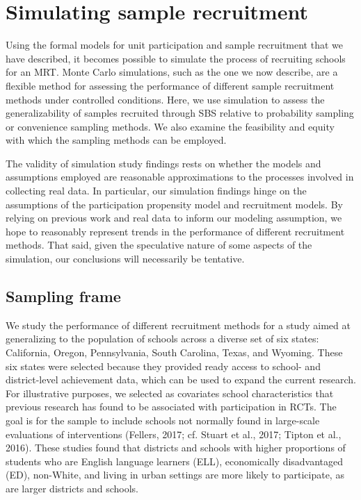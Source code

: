 \documentclass[
  english,
  man,floatsintext]{apa6}
\begin{document}
\hypertarget{simulating-sample-recruitment}{%
\section{Simulating sample recruitment}\label{simulating-sample-recruitment}}

Using the formal models for unit participation and sample recruitment that we have described, it becomes possible to simulate the process of recruiting schools for an MRT.
Monte Carlo simulations, such as the one we now describe, are a flexible method for assessing the performance of different sample recruitment methods under controlled conditions.
Here, we use simulation to assess the generalizability of samples recruited through SBS relative to probability sampling or convenience sampling methods. We also examine the feasibility and equity with which the sampling methods can be employed.

The validity of simulation study findings rests on whether the models and assumptions employed are reasonable approximations to the processes involved in collecting real data. In particular, our simulation findings hinge on the assumptions of the participation propensity model and recruitment models. By relying on previous work and real data to inform our modeling assumption, we hope to reasonably represent trends in the performance of different recruitment methods. That said, given the speculative nature of some aspects of the simulation, our conclusions will necessarily be tentative.

\hypertarget{sampling-frame}{%
\subsection{Sampling frame}\label{sampling-frame}}

We study the performance of different recruitment methods for a study aimed at generalizing to the population of schools across a diverse set of six states: California, Oregon, Pennsylvania, South Carolina, Texas, and Wyoming. These six states were selected because they provided ready access to school- and district-level achievement data, which can be used to expand the current research. For illustrative purposes, we selected as covariates school characteristics that previous research has found to be associated with participation in RCTs. The goal is for the sample to include schools not normally found in large-scale evaluations of interventions (Fellers, 2017; cf. Stuart et al., 2017; Tipton et al., 2016). These studies found that districts and schools with higher proportions of students who are English language learners (ELL), economically disadvantaged (ED), non-White, and living in urban settings are more likely to participate, as are larger districts and schools.
\end{document}
